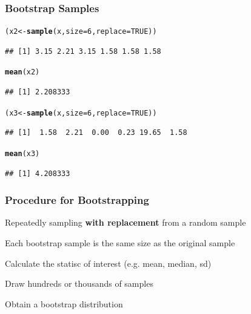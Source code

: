 \documentclass[12pt]{beamer}\usepackage[]{graphicx}\usepackage[]{color}
\makeatletter
\newcommand{\hlnum}[1]{\textcolor[rgb]{0.686,0.059,0.569}{#1}}%
\newcommand{\hlstd}[1]{\textcolor[rgb]{0.345,0.345,0.345}{#1}}%
\newcommand{\hlkwb}[1]{\textcolor[rgb]{0.69,0.353,0.396}{#1}}%
\newcommand{\hlkwc}[1]{\textcolor[rgb]{0.333,0.667,0.333}{#1}}%
\newcommand{\hlkwd}[1]{\textcolor[rgb]{0.737,0.353,0.396}{\textbf{#1}}}%
\newenvironment{kframe}{%
 \def\at@end@of@kframe{}%
 \ifinner\ifhmode%
  \def\at@end@of@kframe{\end{minipage}}%
  \begin{minipage}{\columnwidth}%
 \fi\fi%
 \def\FrameCommand##1{\hskip\@totalleftmargin \hskip-\fboxsep
 \colorbox{shadecolor}{##1}\hskip-\fboxsep
     \hskip-\linewidth \hskip-\@totalleftmargin \hskip\columnwidth}%
 \MakeFramed {\advance\hsize-\width
   \@totalleftmargin\z@ \linewidth\hsize
   \@setminipage}}%
 {\par\unskip\endMakeFramed%
 \at@end@of@kframe}
\newenvironment{knitrout}{}{} %
\makeatother
\begin{document}

\begin{frame}[fragile]
\frametitle{Bootstrap Samples}

\begin{knitrout}\footnotesize
{}\color{fgcolor}\begin{kframe}
\begin{alltt}
\hlstd{(x2} \hlkwb{<-} \hlkwd{sample}\hlstd{(x,} \hlkwc{size} \hlstd{=} \hlnum{6}\hlstd{,} \hlkwc{replace} \hlstd{=} \hlnum{TRUE}\hlstd{))}
\end{alltt}
\begin{verbatim}
## [1] 3.15 2.21 3.15 1.58 1.58 1.58
\end{verbatim}
\begin{alltt}
\hlkwd{mean}\hlstd{(x2)}
\end{alltt}
\begin{verbatim}
## [1] 2.208333
\end{verbatim}
\begin{alltt}
\hlstd{(x3} \hlkwb{<-} \hlkwd{sample}\hlstd{(x,} \hlkwc{size} \hlstd{=} \hlnum{6}\hlstd{,} \hlkwc{replace} \hlstd{=} \hlnum{TRUE}\hlstd{))}
\end{alltt}
\begin{verbatim}
## [1]  1.58  2.21  0.00  0.23 19.65  1.58
\end{verbatim}
\begin{alltt}
\hlkwd{mean}\hlstd{(x3)}
\end{alltt}
\begin{verbatim}
## [1] 4.208333
\end{verbatim}
\end{kframe}
\end{knitrout}

\end{frame}


\begin{frame}
\frametitle{Procedure for Bootstrapping}

\bbi
  \item Repeatedly sampling \textbf{with replacement} from a random sample
  \item Each bootstrap sample is the same size as the original sample
  \item Calculate the statisc of interest (e.g. mean, median, sd)
  \item Draw hundreds or thousands of samples
  \item Obtain a bootstrap distribution
\ei

\end{frame}
\end{document}
